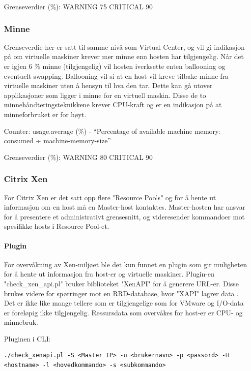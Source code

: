 Grenseverdier (\%): WARNING 75 CRITICAL 90

\subsubsection*{Minne}

Grenseverdie her er satt til samme nivå som Virtual Center, og vil gi indikasjon på om virtuelle maskiner krever mer minne enn hosten har tilgjengelig. Når det er igjen 6 \% minne (tilgjengelig) vil hosten iverksette enten ballooning og eventuelt swapping. Ballooning vil si at en host vil kreve tilbake minne fra virtuelle maskiner uten å hensyn til hva den tar. Dette kan gå utover applikasjoner som ligger i minne for en virtuell maskin. Disse de to minnehåndteringsteknikkene krever CPU-kraft og er en indikasjon på at minneforbruket er for høyt.

Counter: usage.average (\%) - ``Percentage of available machine memory: consumed ÷ machine-memory-size''

Grenseverdier (\%): WARNING 80 CRITICAL 90

\subsubsection{Citrix Xen}

For Citrix Xen er det satt opp flere "Resource Pools"  og for å hente ut informasjon om en host må en Master-host kontaktes. Master-hosten har ansvar
for å presentere et administrativt grensesnitt, og videresender kommandoer mot spesifikke hosts i Resource Pool-et.

\paragraph{Plugin}

For overvåkning av Xen-miljøet ble det kun funnet en plugin som gir muligheten for å hente ut informasjon fra host-er og virtuelle maskiner. Plugin-en "check\_xen\_api.pl"  bruker biblioteket "XenAPI"  for å generere URL-er. Disse brukes videre for spørringer mot en RRD-database, hvor "XAPI"  lagrer data \cite{xenwiki}. Det er ikke like mange tellere som er tilgjengelige som for VMware og I/O-data er foreløpig ikke tilgjengelig. Ressursdata som overvåkes for host-er er CPU- og minnebruk.

Pluginen i CLI:
\begin{lstlisting}[style=example]
./check_xenapi.pl -S <Master IP> -u <brukernavn> -p <passord> -H <hostname> -l <hovedkommando> -s <subkommando>
\end{lstlisting}

